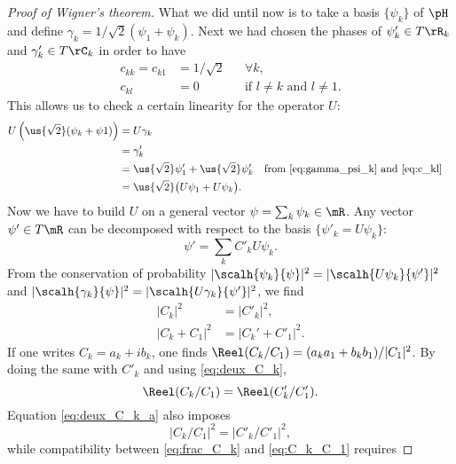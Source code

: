 \begin{proof}[Proof of Wigner's theorem]
What we  did until now is to take a basis $\{\psi_k\}$ of $\pH$ and define $\gamma_k=1/\sqrt2(\psi_1+\psi_k)$. Next we had chosen the phases of $\psi'_k\in T\rR_k$ and $\gamma'_k\in T\rC_k$ in order to have
\begin{equation}\label{eq:c_kl}
\begin{aligned}
   c_{kk}=c_{k1}&=1/\sqrt 2&&\forall k,\\
   c_{kl}&=0 &&\text{if $l\neq k$ and $l\neq 1$}.
\end{aligned}   
\end{equation}
This allows us to check a certain linearity for the operator $U$:
\begin{equation}
\begin{aligned}
U\left( \us{\sqrt 2}(\psi_k+\psi1)  \right)
   &=U\gamma_k\\
   &=\gamma'_k\\
   &=\us{\sqrt 2}\psi'_1+\us{\sqrt 2}\psi'_k&&\text{from \eqref{eq:gamma_psi_k} and \eqref{eq:c_kl}}\\
   &=\us{\sqrt{2}}\big(  U\psi_1+U\psi_k   \big).
\end{aligned}
\end{equation}
Now we have to build $U$ on a general vector $\psi=\sum_k\psi_k\in\mR$. Any vector $\psi'\in T\mR$ can be decomposed with respect to the basis $\{\psi'_k=U\psi_k\}$: 
\begin{equation}\label{eq:dev_Upsi}
  \psi'=\sum_k C'_kU\psi_k.
\end{equation}
From the conservation of probability $|\scalh{\psi_k}{\psi}|^2=|\scalh{U\psi_k}{\psi'}|^2$ and $|\scalh{\gamma_k}{\psi}|^2=|\scalh{U\gamma_k}{\psi'}|^2$, we find
\begin{subequations}\label{eq:deux_C_k}
\begin{align}
          |C_k|^2&=|C'_k|^2, \label{eq:deux_C_k_a} \\
       |C_k+C_1|^2&=|C_k'+C'_1|^2.
\end{align}
\end{subequations}
If one writes $C_k=a_k+ib_k$, one finds $\Reel(C_k/C_1)=(a_ka_1+b_kb_1)/|C_1|^2$. By doing the same with $C'_k$ and using \eqref{eq:deux_C_k},
\begin{equation}\label{eq:C_k_C_1}
  \Reel(C_k/C_1)=\Reel(C'_k/C'_1).
\end{equation}
Equation \eqref{eq:deux_C_k_a} also imposes
\begin{equation}\label{eq:frac_C_k}
 |C_k/C_1|^2=|C'_k/C'_1|^2,
\end{equation}
while compatibility between \eqref{eq:frac_C_k} and \eqref{eq:C_k_C_1} requires

\end{proof}
